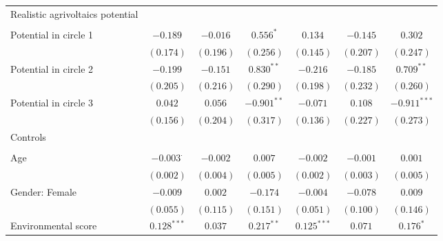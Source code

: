 \begin{center}
\begin{small}
\begin{longtable}{l@{} c@{} c@{} c@{} c@{} c@{} c@{}}
Realistic agrivoltaics potential    &                  &               &               &                 &                &                \\
                                    &                  &               &               &                 &                &                \\
\quad Potential in circle 1         & $-0.189$         & $-0.016$      & $0.556^{*}$   & $0.134$         & $-0.145$       & $0.302$        \\
                                    & $(0.174)$        & $(0.196)$     & $(0.256)$     & $(0.145)$       & $(0.207)$      & $(0.247)$      \\
\quad Potential in circle 2         & $-0.199$         & $-0.151$      & $0.830^{**}$  & $-0.216$        & $-0.185$       & $0.709^{**}$   \\
                                    & $(0.205)$        & $(0.216)$     & $(0.290)$     & $(0.198)$       & $(0.232)$      & $(0.260)$      \\
\quad Potential in circle 3         & $0.042$          & $0.056$       & $-0.901^{**}$ & $-0.071$        & $0.108$        & $-0.911^{***}$ \\
                                    & $(0.156)$        & $(0.204)$     & $(0.317)$     & $(0.136)$       & $(0.227)$      & $(0.273)$      \\
Controls                            &                  &               &               &                 &                &                \\
                                    &                  &               &               &                 &                &                \\
\quad Age                           & $-0.003^{\cdot}$ & $-0.002$      & $0.007$       & $-0.002$        & $-0.001$       & $0.001$        \\
                                    & $(0.002)$        & $(0.004)$     & $(0.005)$     & $(0.002)$       & $(0.003)$      & $(0.005)$      \\
\quad Gender: Female                & $-0.009$         & $0.002$       & $-0.174$      & $-0.004$        & $-0.078$       & $0.009$        \\
                                    & $(0.055)$        & $(0.115)$     & $(0.151)$     & $(0.051)$       & $(0.100)$      & $(0.146)$      \\
\quad Environmental score           & $0.128^{***}$    & $0.037$       & $0.217^{**}$  & $0.125^{***}$   & $0.071$        & $0.176^{*}$    \\

\end{longtable}
\end{small}
\end{center}
